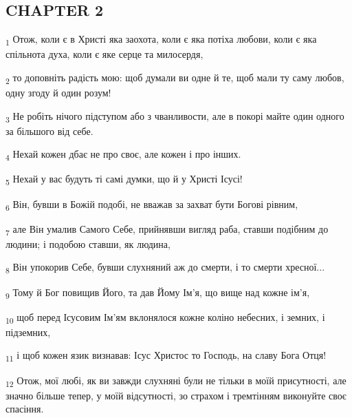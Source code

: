 \subsection{CHAPTER 2}
\begin{tcolorbox}
\textsubscript{1} Отож, коли є в Христі яка заохота, коли є яка потіха любови, коли є яка спільнота духа, коли є яке серце та милосердя,
\end{tcolorbox}
\begin{tcolorbox}
\textsubscript{2} то доповніть радість мою: щоб думали ви одне й те, щоб мали ту саму любов, одну згоду й один розум!
\end{tcolorbox}
\begin{tcolorbox}
\textsubscript{3} Не робіть нічого підступом або з чванливости, але в покорі майте один одного за більшого від себе.
\end{tcolorbox}
\begin{tcolorbox}
\textsubscript{4} Нехай кожен дбає не про своє, але кожен і про інших.
\end{tcolorbox}
\begin{tcolorbox}
\textsubscript{5} Нехай у вас будуть ті самі думки, що й у Христі Ісусі!
\end{tcolorbox}
\begin{tcolorbox}
\textsubscript{6} Він, бувши в Божій подобі, не вважав за захват бути Богові рівним,
\end{tcolorbox}
\begin{tcolorbox}
\textsubscript{7} але Він умалив Самого Себе, прийнявши вигляд раба, ставши подібним до людини; і подобою ставши, як людина,
\end{tcolorbox}
\begin{tcolorbox}
\textsubscript{8} Він упокорив Себе, бувши слухняний аж до смерти, і то смерти хресної...
\end{tcolorbox}
\begin{tcolorbox}
\textsubscript{9} Тому й Бог повищив Його, та дав Йому Ім'я, що вище над кожне ім'я,
\end{tcolorbox}
\begin{tcolorbox}
\textsubscript{10} щоб перед Ісусовим Ім'ям вклонялося кожне коліно небесних, і земних, і підземних,
\end{tcolorbox}
\begin{tcolorbox}
\textsubscript{11} і щоб кожен язик визнавав: Ісус Христос то Господь, на славу Бога Отця!
\end{tcolorbox}
\begin{tcolorbox}
\textsubscript{12} Отож, мої любі, як ви завжди слухняні були не тільки в моїй присутності, але значно більше тепер, у моїй відсутності, зо страхом і тремтінням виконуйте своє спасіння.
\end{tcolorbox}

